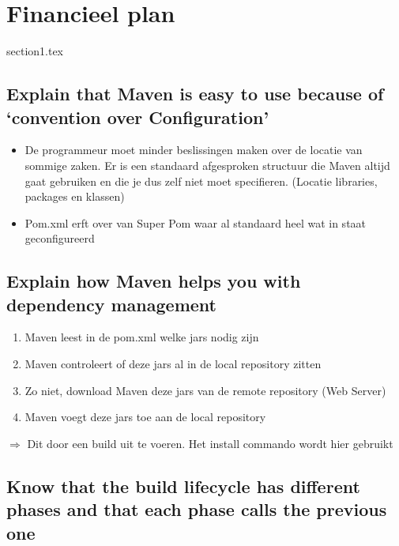 \chapter{Financieel plan}
\label{Maven}
\thispagestyle{chapternohead}

	
\pagestyle{ruledfilip}
{section1.tex}
\section{Explain that Maven is easy to use because of ‘convention over Configuration’}

\begin{itemize}
	\item De programmeur moet minder beslissingen maken over de locatie van sommige zaken. Er is een standaard afgesproken structuur die Maven altijd gaat gebruiken en die je dus zelf niet moet specifieren. (Locatie libraries, packages en klassen)
	\item Pom.xml erft over van Super Pom waar al standaard heel wat in staat geconfigureerd
\end{itemize}

\section{Explain how Maven helps you with dependency management}
\begin{enumerate}
	\item Maven leest in de pom.xml welke jars nodig zijn
	\item Maven controleert of deze jars al in de local repository zitten
	\item Zo niet, download Maven deze jars van de remote repository (Web Server)
	\item Maven voegt deze jars toe aan de local repository
\end{enumerate}

$\Rightarrow$ Dit door een build uit te voeren. Het install commando wordt hier gebruikt

\section{Know that the build lifecycle has different phases and that each phase calls the previous one}

